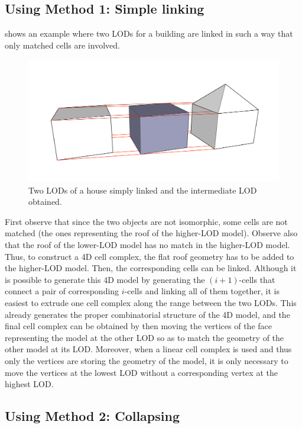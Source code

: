 \subsection{Using Method 1: Simple linking}

 shows an example where two LODs for a building are linked in such a way that only matched cells are involved.
\begin{figure}[tb]
   \centering
   \includegraphics[width=\linewidth]{figs/exsimple}
   \caption[Simple linking]{Two LODs of a house simply linked and the intermediate LOD obtained.}
\label{fig:exsimple}
\end{figure}
First observe that since the two objects are not isomorphic, some cells are not matched (the ones representing the roof of the higher-LOD model).
Observe also that the roof of the lower-LOD model has no match in the higher-LOD model.
Thus, to construct a 4D cell complex, the flat roof geometry has to be added to the higher-LOD model.
Then, the corresponding cells can be linked.
Although it is possible to generate this 4D model by generating the $(i+1)$-cells that connect a pair of corresponding $i$-cells and linking all of them together, it is easiest to extrude one cell complex along the range between the two LODs.
This already generates the proper combinatorial structure of the 4D model, and the final cell complex can be obtained by then moving the vertices of the face representing the model at the other LOD so as to match the geometry of the other model at its LOD.\@
Moreover, when a linear cell complex is used and thus only the vertices are storing the geometry of the model, it is only necessary to move the vertices at the lowest LOD without a corresponding vertex at the highest LOD.\@


\subsection{Using Method 2: Collapsing}


